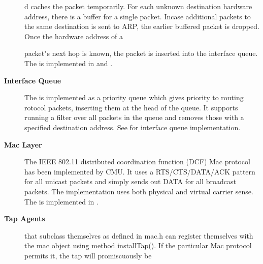\begin{description}
d caches the packet temporarily. For each unknown destination hardware address, there is a buffer for a single packet. Incase additional packets to the same destination is sent to ARP, the earlier buffered packet is dropped. Once the hardware address of a






















 packet"s next hop is known, the packet is inserted into the interface queue. The  is implemented in  and .

\item[{\bf Interface Queue}] The  is implemented as a priority queue which gives priority to routing 
rotocol packets, inserting them at the head of the queue. It supports
running a filter over all packets in the queue and removes those with
a specified destination address. See  for 
interface queue implementation.

\item[{\bf Mac Layer}] The IEEE 802.11 distributed coordination 
function (DCF) Mac protocol has been implemented by CMU. It uses a 
RTS/CTS/DATA/ACK pattern for all unicast packets and simply sends out
 DATA for all broadcast packets. The implementation uses both 
physical and virtual carrier sense. The  is implemented in .

\item[{\bf Tap Agents}]  that subclass themselves as  defined in mac.h can register themselves with the mac object using method installTap(). If the particular Mac protocol permits it, the tap will promiscuously be 























\end{description}
